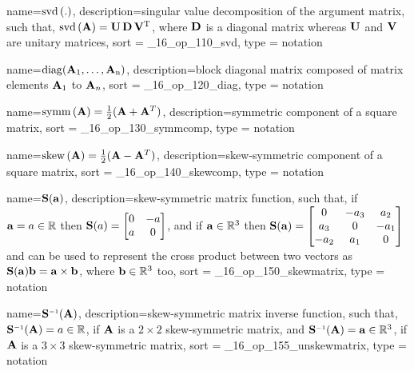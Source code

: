 {
  name={\ensuremath{\svd{.}}},
  description={singular value decomposition of the argument matrix, such that, 
    $\rm{svd}\left(\mathbf{A}\right) = \mathbf{U}\,\mathbf{D}\,\mathbf{V}^T$, where $\mathbf{D}$ is a diagonal matrix whereas 
    $\mathbf{U}$ and $\mathbf{V}$ are unitary matrices},
  sort = _16_op_110_svd,
  type = notation
}

{
  name={\ensuremath{\rm{diag}(\mat{A}_1, \ldots, \mat{A}_n)}},
  description={block diagonal matrix composed of matrix elements $\mathbf{A}_1$ to $\mathbf{A}_n$},
  sort = _16_op_120_diag,
  type = notation
}

{
  name={\ensuremath{\symmcomp{\mat{A}} = \frac{1}{2}(\mat{A} + \mat{A}^T)}},
  description={symmetric component of a square matrix},
  sort = _16_op_130_symmcomp,
  type = notation
}

{
  name={\ensuremath{\skewcomp{\mat{A}} = \frac{1}{2}(\mat{A} - \mat{A}^T)}},
  description={skew-symmetric component of a square matrix},
  sort = _16_op_140_skewcomp,
  type = notation
}

{
  name={\ensuremath{\matskew{\bvec{a}}}},
  description={skew-symmetric matrix function, such that, if $\mathbf{a} = a \in \mathbb{R}$ 
                then $\mathbf{S}(a) = \begin{bmatrix} 0 & -a \\ a & 0 \\ \end{bmatrix}$, 
                and if $\mathbf{a} \in \mathbb{R}^{3}$ then $\mathbf{S}(\mathbf{a}) = \begin{bmatrix} 
                0 & -a_3 & a_2 \\ a_3 & 0 & -a_1 \\ -a_2 & a_1 & 0 \\ \end{bmatrix}$
                and can be used to represent the cross product between two vectors as 
                $\mathbf{S}(\mathbf{a})\mathbf{b} = \mathbf{a} \times \mathbf{b}$, where $\mathbf{b} \in \mathbb{R}^{3}$ too},
  sort = _16_op_150_skewmatrix,
  type = notation
}

{
  name={\ensuremath{\matunskew{\mat{A}}}},
  description={skew-symmetric matrix inverse function, such that, 
                $\mathbf{S}^{\scriptscriptstyle -1}(\mathbf{A}) = a \in \mathbb{R}$, if $\mathbf{A}$ is a $2\times 2$ 
                skew-symmetric matrix, and $\mathbf{S}^{\scriptscriptstyle -1}(\mathbf{A}) = \mathbf{a} \in \mathbb{R}^3$, if 
                $\mathbf{A}$ is a $3\times 3$ skew-symmetric matrix},
  sort = _16_op_155_unskewmatrix,
  type = notation
}

